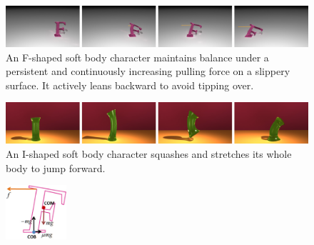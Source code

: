 \begin{figure}[t]
\centering
\includegraphics[width=\textwidth]{figures/FBalance.eps}
\caption{An F-shaped soft body character maintains balance under a persistent and continuously increasing pulling force on a slippery surface. It actively leans backward to avoid tipping over.}
\label{fig:FBalance}
\end{figure}

\begin{figure}[t]
\centering
\includegraphics[width=\textwidth]{figures/IJump.eps}
\caption{An I-shaped soft body character squashes and stretches its whole body to jump forward.}
\label{fig:IJump}
\end{figure}


\begin{figure}
\center
\hspace{-30pt}
\includegraphics[width=0.2\textwidth]{figures/SlideController.eps}
\end{figure}

